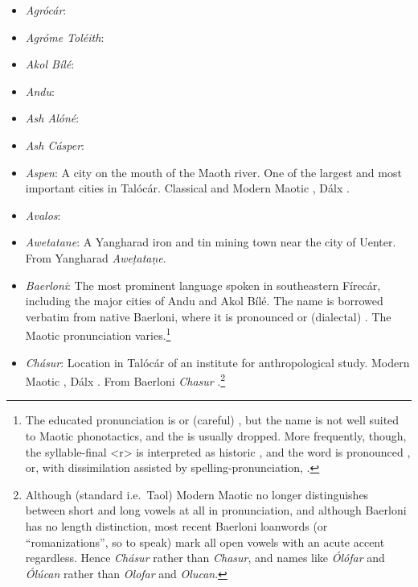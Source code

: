 \documentclass{article}
\begin{document}
\begin{itemize}
 \item \textit{Agrócár}:

 \item \textit{Agróme Toléith}:

 \item \textit{Akol Bílé}:

 \item \textit{Andu}:

 \item \textit{Ash Alóné}:

 \item \textit{Ash Cásper}:

 \item \textit{Aspen}: A city on the mouth of the Maoth river. One of the largest and most important cities in Talócár. Classical and Modern Maotic , Dálx .

 \item \textit{Avalos}:

 \item \textit{Awetatane}: A Yangharad iron and tin mining town near the city of Uenter. From Yangharad \textit{Awe\d{t}ata\d{n}e}.

 \item \textit{Baerloni}: The most prominent language spoken in southeastern Fírecár, including the major cities of Andu and Akol Bílé. The name is borrowed verbatim from native Baerloni, where it is pronounced  or (dialectal) . The Maotic pronunciation varies.\footnote{The educated pronunciation is  or (careful) , but the name is not well suited to Maotic phonotactics, and the  is usually dropped. More frequently, though, the syllable-final <r> is interpreted as historic , and the word is pronounced , or, with dissimilation assisted by spelling-pronunciation, .}

 \item \textit{Chásur}: Location in Talócár of an institute for anthropological study. Modern Maotic , Dálx . From Baerloni \textit{Chasur} .\footnote{Although (standard i.e.\ Taol) Modern Maotic no longer distinguishes between short and long vowels at all in pronunciation, and although Baerloni has no length distinction, most recent Baerloni loanwords (or ``romanizations'', so to speak) mark all open vowels with an acute accent regardless. Hence \textit{Chásur} rather than \textit{Chasur}, and names like \textit{Ólófar} and \textit{Ólúcan} rather than \textit{Olofar} and \textit{Olucan}.}


\end{itemize}
\end{document}
